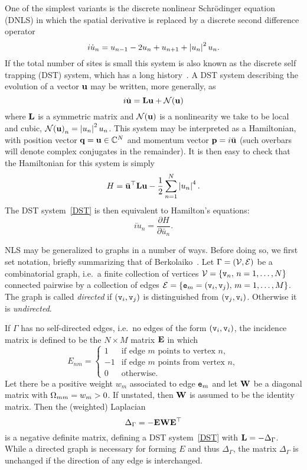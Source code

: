 \documentclass{article}
\numberwithin{equation}{section}
\numberwithin{figure}{section}
\begin{document}
One of the simplest variants is the discrete nonlinear Schr\"odinger equation (DNLS) in which the spatial derivative is replaced by a discrete second difference operator
\begin{equation}
i \dot{u}_n = u_{n-1} - 2 u_n + u_{n+1}  +\left\lvert u_n\right\rvert^2 u_n.
\label{DNLS}
\end{equation}
If the total number of sites is small this system is also known as the discrete self trapping (DST) system, which has a long history~\cite{Eilbeck:1985tu,Eilbeck:2003vl,Kevrekidis:2009vv}. A DST system describing the evolution of a vector $\mathbf{u}$ may be written, more generally, as 
\begin{equation}
i \dot{\mathbf{u}} = \mathbf{L} \mathbf{u} + \mathcal{N}(\mathbf{u})
\label{DST}
\end{equation}
where $\mathbf{L}$ is a symmetric matrix and $\mathcal{N}(\mathbf{u})$ is a nonlinearity we take to be local and cubic, ${\mathcal{N}(\mathbf{u})}_n = \left\lvert u_n\right\rvert^2 u_n$. This system may be interpreted as a Hamiltonian, with position vector $\mathbf{q}=\mathbf{u} \in \mathbb{C}^N$ and momentum vector $\mathbf{p} = i \bar{\mathbf{u}}$ (such overbars will denote complex conjugates in the remainder). It is then easy to check that the Hamiltonian for this system is simply
 \begin{equation}
\label{Hu}
 H = \bar{\mathbf{u}}^{\top} \mathbf{L} \mathbf{u} -\frac{1}{2} \sum_{n=1}^N \left\lvert u_n\right\rvert^4.
\end{equation} 
The DST system~\eqref{DST} is then equivalent to Hamilton's equations:
\begin{equation}
i \dot{u}_n = \frac{\partial H}{\partial\bar{u}_n}.
\label{iundot}
\end{equation}

NLS may be generalized to graphs in a number of ways. Before doing so, we first set notation, briefly summarizing that of Berkolaiko~\cite{Berkolaiko:2017}. Let $\Gamma=(\mathcal{V},\mathcal{E})$ be a combinatorial graph, i.e.\ a finite collection of vertices $\mathcal{V}=\{\mathtt{v}_n, \, n= 1,\ldots,N\}$ connected pairwise by a collection 
of edges $\mathcal{E}=\{\mathtt{e}_m=(\mathtt{v}_i,\mathtt{v}_j),\, m= 1,\ldots,M\}$. The graph is called \emph{directed} if $(\mathtt{v}_i,\mathtt{v}_j)$ is distinguished from $(\mathtt{v}_j,\mathtt{v}_i)$. Otherwise it is \emph{undirected}. 

If $\Gamma$ has no self-directed edges, i.e.\ no edges of the form $(\mathtt{v}_i,\mathtt{v}_i)$, the incidence matrix is defined to be the $N\times M$ matrix $\mathbf{E}$ in which
$$
E_{nm} = 
\begin{cases}
1 & \text{if edge $m$ points to vertex $n$}, \\
-1 & \text{if edge $m$ points from vertex $n$}, \\
0 & \text{otherwise}.
\end{cases}
$$
Let there be a positive weight $w_m$ associated to edge $\mathtt{e}_m$ and let $\mathbf{W}$ be a diagonal matrix with $\Omega_{mm} = w_m >0$. If unstated, then $\mathbf{W}$ is assumed to be the identity matrix. Then the (weighted) Laplacian
$$
\Delta_\Gamma = -\mathbf{E} \mathbf{W} \mathbf{E}^{\top}
$$ 
is a negative definite matrix, defining a DST system~\eqref{DST} with $\mathbf{L} = -\Delta_\Gamma$.  While a directed graph is necessary for forming $E$ and thus $\Delta_\Gamma$, the matrix $\Delta_\Gamma$ is unchanged if the direction of any edge is interchanged.
\end{document}

